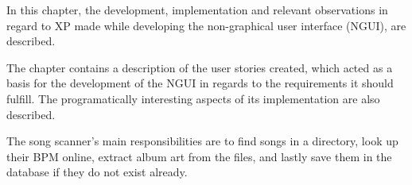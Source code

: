 In this chapter, the development, implementation and relevant observations in regard to XP made while developing the non-graphical user interface (NGUI), are described. 

The chapter contains a description of the user stories created, which acted as a basis for the development of the NGUI in regards to the requirements it should fulfill. The programatically interesting aspects of its implementation are also described. 

The song scanner's main responsibilities are to find songs in a directory, look up their BPM online, extract album art from the files, and lastly save them in the database if they do not exist already.